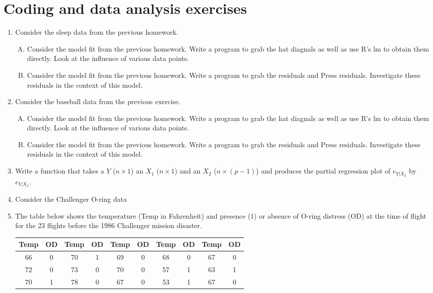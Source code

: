 \documentclass[12pt]{article}
\begin{document}
\section{Coding and data analysis exercises}
\begin{enumerate}
\item Consider the sleep data from the previous homework.
\begin{enumerate}[A.]
\item Consider the model fit from the previous homework. Write a program to grab the hat diagnals as well as use R's lm to obtain them directly. 
	Look at the influence of various data points.
\item Consider the model fit from the previous homework. Write a program to grab the residuals and Press residuals. Investigate these residuals
	in the context of this model.
\end{enumerate}
\item Consider the baseball data from the previous exercise.
\begin{enumerate}[A.]
\item Consider the model fit from the previous homework. Write a program to grab the hat diagnals as well as use R's lm to obtain them directly. 
	Look at the influence of various data points.
\item Consider the model fit from the previous homework. Write a program to grab the residuals and Press residuals. Investigate these residuals
	in the context of this model.
\end{enumerate}
\item Write a function that takes a $Y$ ($n\times 1$) an $X_1$ ($n \times 1$) and an $X_2$ ($n \times (p-1)$) and produces the partial regression
	plot of $e_{Y | X_2}$ by $e_{Y | X_2}$. 
\item Consider the Challenger O-ring data
\item The table below shows the temperature (Temp in Fahrenheit) and presence (1) or
  absence of O-ring distress (OD) at the time of flight for the 23 flights
  before the 1986 Challenger mission disaster.
\begin{center}
  \begin{tabular}{cc|cc|cc|cc|cc}
    \hline
    Temp & OD & Temp & OD & Temp & OD & Temp & OD & Temp & OD  \\ \hline
    66 & 0 & 70 & 1 & 69 & 0 & 68 & 0 & 67 & 0 \\
    72 & 0 & 73 & 0 & 70 & 0 & 57 & 1 & 63 & 1 \\
    70 & 1 & 78 & 0 & 67 & 0 & 53 & 1 & 67 & 0 \\

\end{tabular}
\end{center}
\end{enumerate}
\end{document}
